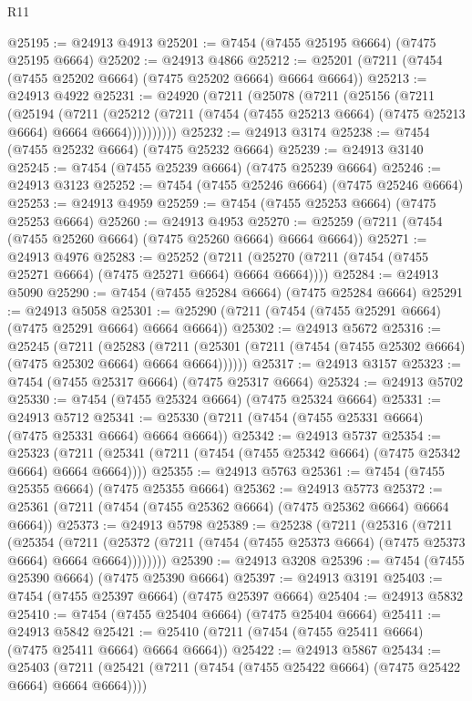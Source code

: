\begin{lexlean}{R11}
\begin{coremodule}
@25195 := @24913 @4913
@25201 := @7454 (@7455 @25195 @6664) (@7475 @25195 @6664)
@25202 := @24913 @4866
@25212 := @25201 (@7211 (@7454 (@7455 @25202 @6664) (@7475 @25202 @6664) @6664 @6664))
@25213 := @24913 @4922
@25231 := @24920
    (@7211
      (@25078
        (@7211
          (@25156
            (@7211
              (@25194
                (@7211
                  (@25212
                    (@7211 (@7454 (@7455 @25213 @6664) (@7475 @25213 @6664) @6664 @6664))))))))))
@25232 := @24913 @3174
@25238 := @7454 (@7455 @25232 @6664) (@7475 @25232 @6664)
@25239 := @24913 @3140
@25245 := @7454 (@7455 @25239 @6664) (@7475 @25239 @6664)
@25246 := @24913 @3123
@25252 := @7454 (@7455 @25246 @6664) (@7475 @25246 @6664)
@25253 := @24913 @4959
@25259 := @7454 (@7455 @25253 @6664) (@7475 @25253 @6664)
@25260 := @24913 @4953
@25270 := @25259 (@7211 (@7454 (@7455 @25260 @6664) (@7475 @25260 @6664) @6664 @6664))
@25271 := @24913 @4976
@25283 := @25252
    (@7211 (@25270 (@7211 (@7454 (@7455 @25271 @6664) (@7475 @25271 @6664) @6664 @6664))))
@25284 := @24913 @5090
@25290 := @7454 (@7455 @25284 @6664) (@7475 @25284 @6664)
@25291 := @24913 @5058
@25301 := @25290 (@7211 (@7454 (@7455 @25291 @6664) (@7475 @25291 @6664) @6664 @6664))
@25302 := @24913 @5672
@25316 := @25245
    (@7211
      (@25283
        (@7211 (@25301 (@7211 (@7454 (@7455 @25302 @6664) (@7475 @25302 @6664) @6664 @6664))))))
@25317 := @24913 @3157
@25323 := @7454 (@7455 @25317 @6664) (@7475 @25317 @6664)
@25324 := @24913 @5702
@25330 := @7454 (@7455 @25324 @6664) (@7475 @25324 @6664)
@25331 := @24913 @5712
@25341 := @25330 (@7211 (@7454 (@7455 @25331 @6664) (@7475 @25331 @6664) @6664 @6664))
@25342 := @24913 @5737
@25354 := @25323
    (@7211 (@25341 (@7211 (@7454 (@7455 @25342 @6664) (@7475 @25342 @6664) @6664 @6664))))
@25355 := @24913 @5763
@25361 := @7454 (@7455 @25355 @6664) (@7475 @25355 @6664)
@25362 := @24913 @5773
@25372 := @25361 (@7211 (@7454 (@7455 @25362 @6664) (@7475 @25362 @6664) @6664 @6664))
@25373 := @24913 @5798
@25389 := @25238
    (@7211
      (@25316
        (@7211
          (@25354
            (@7211
              (@25372 (@7211 (@7454 (@7455 @25373 @6664) (@7475 @25373 @6664) @6664 @6664))))))))
@25390 := @24913 @3208
@25396 := @7454 (@7455 @25390 @6664) (@7475 @25390 @6664)
@25397 := @24913 @3191
@25403 := @7454 (@7455 @25397 @6664) (@7475 @25397 @6664)
@25404 := @24913 @5832
@25410 := @7454 (@7455 @25404 @6664) (@7475 @25404 @6664)
@25411 := @24913 @5842
@25421 := @25410 (@7211 (@7454 (@7455 @25411 @6664) (@7475 @25411 @6664) @6664 @6664))
@25422 := @24913 @5867
@25434 := @25403
    (@7211 (@25421 (@7211 (@7454 (@7455 @25422 @6664) (@7475 @25422 @6664) @6664 @6664))))

\end{coremodule}
\end{lexlean}
